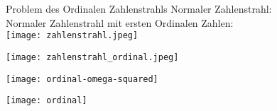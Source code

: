 \begin{frame}[c]{Problem des Ordinalen Zahlenstrahls}
    \large
     {Normaler Zahlenstrahl: \\}
     {Normaler Zahlenstrahl mit ersten Ordinalen Zahlen:\\}
    \Huge
     {
        \texttt{[image: zahlenstrahl.jpeg]}
    }

     {
        \texttt{[image: zahlenstrahl\_ordinal.jpeg]}
    }

     {
        \texttt{[image: ordinal-omega-squared]}
    }

     {
        \hspace{2cm}
        \texttt{[image: ordinal]}
    }

\end{frame}




